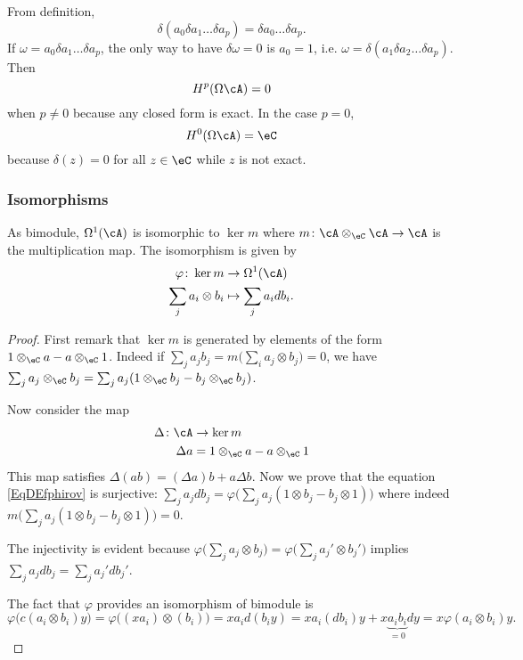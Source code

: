 From definition,
\[ 
  \delta(a_0\delta a_1\ldots\delta a_p)=\delta a_0\ldots\delta a_p.
\]
If $\omega=a_0\delta a_1\ldots\delta a_p$, the only way to have $\delta\omega=0$ is $a_0=1$, i.e. $\omega=\delta(a_1\delta a_2\ldots\delta a_p)$. Then
\[ 
  H^p(\Omega\cA)=0
\]
when $p\neq 0$ because any closed form is exact. In the case $p=0$,
\[ 
  H^0(\Omega\cA)=\eC
\]
because $\delta(z)=0$ for all $z\in\eC$ while $z$ is not exact.

\subsubsection{Isomorphisms}

\begin{lemma}
As bimodule, $\Omega^1(\cA)$ is isomorphic to $\ker m$ where $m\colon \cA\otimes_{\eC}\cA\to \cA$ is the multiplication map. The isomorphism is given by
\begin{equation}   \label{EqDEfphirov}
\begin{aligned}
 \varphi\colon \ker m&\to \Omega^1(\cA) \\ 
\sum_{j}a_i\otimes b_i&\mapsto \sum_{j}a_idb_i. 
\end{aligned}
\end{equation}

\end{lemma}

\begin{proof}
First remark that $\ker m$ is generated by elements of the form $1\otimes_{\eC}a-a\otimes_{\eC}1$. Indeed if $\sum_{j}a_jb_j=m\big( \sum_{i}a_j\otimes b_j \big)=0$, we have $\sum_{j}a_j\otimes_{\eC}b_j=\sum_{j}a_j(1\otimes_{\eC} b_j-b_j\otimes_{\eC}b_j)$.

Now consider the map 
\begin{equation}
\begin{aligned}
 \Delta\colon \cA&\to \ker m \\ 
\Delta a&= 1\otimes_{\eC}a-a\otimes_{\eC}1
\end{aligned}
\end{equation}
This map satisfies $\Delta(ab)=(\Delta a)b+a\Delta b$. Now we prove that the equation \eqref{EqDEfphirov} is surjective: $\sum_{j}a_jdb_j=\varphi\big( \sum_{j}a_j(1\otimes b_j-b_j\otimes 1) \big)$ where indeed $m\big( \sum_{j}a_j(1\otimes b_j-b_j\otimes 1) \big)=0$. 

The injectivity is evident because $\varphi\big( \sum_{j}a_j\otimes b_j \big)=\varphi\big( \sum_{j}a_j'\otimes b_j' \big)$ implies $\sum_{j}a_jdb_j=\sum_{j}a_j'db_j'$.

The fact that $\varphi$ provides an isomorphism of bimodule is
\[ 
	\varphi\big( c(a_i\otimes b_i)y \big)=\varphi\big( (xa_i)\otimes(b_i) \big)
		=xa_id(b_iy)
		=xa_i(db_i)y+x\underbrace{a_ib_i}_{=0}dy
		=x\varphi(a_i\otimes b_i)y.
\]
\end{proof}

